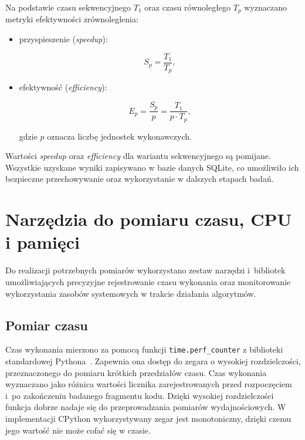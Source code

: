 Na podstawie czasu sekwencyjnego $T_1$ oraz czasu równoległego $T_p$ 
wyznaczano metryki efektywności zrównoleglenia:
\begin{itemize}
    \item przyspieszenie (\textit{speedup}):

    \begin{equation}
        S_p = \frac{T_1}{T_p},
    \end{equation}

    \item efektywność (\textit{efficiency}):
    
    \begin{equation}
        E_p = \frac{S_p}{p} = \frac{T_1}{p \cdot T_p},
    \end{equation}

    gdzie $p$ oznacza liczbę jednostek wykonawczych.
\end{itemize}

Wartości \textit{speedup} oraz \textit{efficiency} dla wariantu sekwencyjnego są pomijane.
Wszystkie uzyskane wyniki zapisywano w bazie danych SQLite, 
co umożliwiło ich bezpieczne przechowywanie oraz wykorzystanie w dalszych etapach badań.

\section{Narzędzia do pomiaru czasu, CPU i pamięci}
\label{sec:NarzedziaPomiaru}

Do realizacji potrzebnych pomiarów wykorzystano zestaw narzędzi i~bibliotek umożliwiających 
precyzyjne rejestrowanie czasu wykonania oraz monitorowanie wykorzystania zasobów systemowych w trakcie działania algorytmów.

\subsection*{Pomiar czasu}

Czas wykonania mierzono za pomocą funkcji \texttt{time.perf\_counter} z biblioteki standardowej Pythona~\cite{bib:PerfCounter}. 
Zapewnia ona dostęp do zegara o wysokiej rozdzielczości, przeznaczonego do pomiaru krótkich przedziałów czasu. 
Czas wykonania wyznaczano jako różnica wartości licznika zarejestrowanych przed rozpoczęciem i~po zakończeniu
badanego fragmentu kodu. Dzięki wysokiej rozdzielczości funkcja dobrze nadaje się do przeprowadzania pomiarów wydajnościowych. 
W implementacji CPython wykorzystywany zegar jest monotoniczny, dzięki czemu jego wartość nie może cofać się w czasie.

